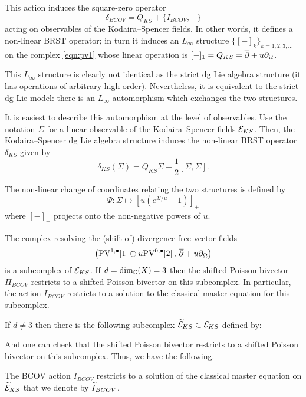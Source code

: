 \documentclass[11pt]{amsart}
\begin{document}
This action induces the square-zero operator 
\[
\delta_{BCOV} = Q_{KS} + \{I_{BCOV}, -\} 
\]
acting on observables of the Kodaira--Spencer fields. 
In other words, it defines a non-linear BRST operator; in turn it
induces an $L_\infty$ structure $\{[-]_k\}_{k =1,2,3,\ldots}$ on the complex \eqref{eqn:pv1} whose linear operation is $[-]_1 = Q_{KS} = \overline{\partial} + u\partial_{\Omega}$. 

This $L_\infty$ structure is clearly not identical as the strict dg Lie algebra structure (it has operations of arbitrary high order). 
Nevertheless, it is equivalent to the strict dg Lie model: there is an $L_\infty$ automorphism which exchanges the two structures.

It is easiest to describe this automorphism at the level of observables.
Use the notation $\Sigma$ for a linear observable of the Kodaira--Spencer fields $\mathcal E_{KS}$. 
Then, the Kodaira--Spencer dg Lie algebra structure induces the non-linear BRST operator $\delta_{KS}$ given by
\[
\delta_{KS} (\Sigma) = Q_{KS} \Sigma + \frac12 [\Sigma,\Sigma] .
\]

The non-linear change of coordinates relating the two structures is defined by
\[
\Psi \colon \Sigma \mapsto \left[u (e^{\Sigma/u} -1)\right]_+
\]
where $[-]_+$ projects onto the non-negative powers of $u$.  

\parsec[]

The complex resolving the (shift of) divergence-free vector fields 
\[
\left({\rm PV}^{1,\bullet}[1] \oplus u {\rm PV}^{0,\bullet}[2] \, , \, \overline{\partial} + u \partial_{\Omega}\right) 
\]
is a subcomplex of $\mathcal E_{KS}$.
If $d = \dim_\mathbb C(X)=3$ then the shifted Poisson bivector $\Pi_{BCOV}$ restricts to a shifted Poisson bivector on this subcomplex. 
In particular, the action $I_{BCOV}$ restricts to a solution to the classical master equation for this subcomplex. 

If $d \ne 3$ then there is the following subcomplex $\widetilde{\mathcal E}_{KS}\subset \mathcal E_{KS}$ defined by:
\beqn\label{eqn:tilks}
\eeqn
And one can check that the shifted Poisson bivector restricts to a shifted Poisson bivector on this subcomplex. 
Thus, we have the following.

\begin{prop}
\label{prop:tilbcov}
The BCOV action $I_{BCOV}$ restricts to a solution of the classical master equation on $\widetilde{\mathcal E}_{KS}$ that we denote by $\widetilde{I}_{BCOV}$. 
\end{prop}
\end{document}
